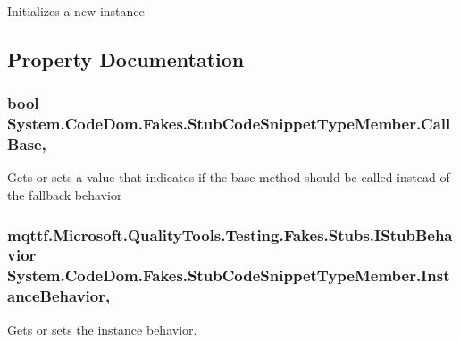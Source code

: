Initializes a new instance



\subsection{Property Documentation}
\hypertarget{class_system_1_1_code_dom_1_1_fakes_1_1_stub_code_snippet_type_member_a3611c378f3e7a7c4a58830dbf69a6ba6}{
\subsubsection[{Call\-Base}]{\setlength{\rightskip}{0pt plus 5cm}bool System.\-Code\-Dom.\-Fakes.\-Stub\-Code\-Snippet\-Type\-Member.\-Call\-Base\hspace{0.3cm}{\ttfamily [get]}, {\ttfamily [set]}}}\label{class_system_1_1_code_dom_1_1_fakes_1_1_stub_code_snippet_type_member_a3611c378f3e7a7c4a58830dbf69a6ba6}


Gets or sets a value that indicates if the base method should be called instead of the fallback behavior

\hypertarget{class_system_1_1_code_dom_1_1_fakes_1_1_stub_code_snippet_type_member_addbd5e383a4035fe0b8d62bf7bdcc059}{
\subsubsection[{Instance\-Behavior}]{\setlength{\rightskip}{0pt plus 5cm}mqttf.\-Microsoft.\-Quality\-Tools.\-Testing.\-Fakes.\-Stubs.\-I\-Stub\-Behavior System.\-Code\-Dom.\-Fakes.\-Stub\-Code\-Snippet\-Type\-Member.\-Instance\-Behavior\hspace{0.3cm}{\ttfamily [get]}, {\ttfamily [set]}}}\label{class_system_1_1_code_dom_1_1_fakes_1_1_stub_code_snippet_type_member_addbd5e383a4035fe0b8d62bf7bdcc059}


Gets or sets the instance behavior.

